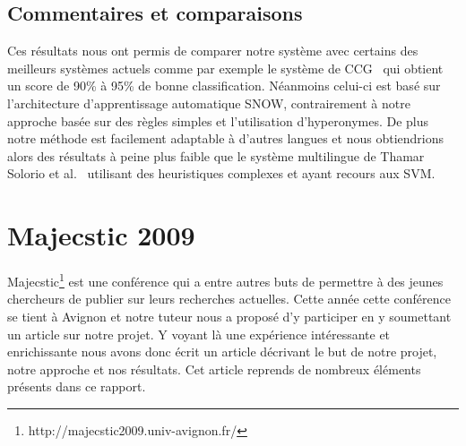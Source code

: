 \documentclass[10pt,a4paper]{article}
\begin{document}
\subsection{Commentaires et comparaisons}
\par Ces résultats nous ont permis de comparer notre système avec certains des meilleurs systèmes actuels
 comme par exemple le système de CCG~\cite{learning:paper} qui obtient un score de 90\% à 95\% de bonne classification. Néanmoins celui-ci est basé sur l'architecture d'apprentissage automatique SNOW, contrairement à notre approche basée sur des règles simples et l'utilisation d'hyperonymes.
De plus notre méthode est facilement adaptable à d'autres langues 
 et nous obtiendrions alors des résultats à peine plus faible que le système multilingue de Thamar Solorio et al.~\cite{solorio:paper} utilisant des heuristiques complexes et ayant recours aux SVM.

\section{Majecstic 2009}
\par Majecstic\footnote{http://majecstic2009.univ-avignon.fr/} est une conférence qui a entre autres buts de permettre à des jeunes chercheurs de publier sur leurs recherches actuelles. Cette année cette conférence se tient à Avignon et notre tuteur nous a proposé d'y participer en y soumettant un article sur notre projet. Y voyant là une expérience intéressante et enrichissante nous avons donc écrit un article décrivant le but de notre projet, notre approche et nos résultats. Cet article reprends de nombreux éléments présents dans ce rapport. %
\end{document}
